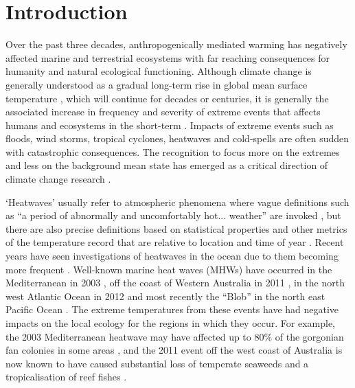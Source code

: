 \documentclass[a4paper,10pt,review]{elsarticle}
\begin{document}
\linenumbers

\section{Introduction}
Over the past three decades, anthropogenically mediated warming has negatively affected marine and terrestrial ecosystems with far reaching consequences for humanity and natural ecological functioning. Although climate change is generally understood as a gradual long-term rise in global mean surface temperature \citep{IPCC2014}, which will continue for decades or centuries, it is generally the associated increase in frequency and severity of extreme events that affects humans and ecosystems in the short-term \citep{Easterling2000}. Impacts of extreme events such as floods, wind storms, tropical cyclones, heatwaves and cold-spells are often sudden with catastrophic consequences. The recognition to focus more on the extremes and less on the background mean state has emerged as a critical direction of climate change research \citep{Jentsch2007}.

`Heatwaves' usually refer to atmospheric phenomena where vague definitions such as ``a period of abnormally and uncomfortably hot... weather'' are invoked \citep{Glickman2000}, but there are also precise definitions based on statistical properties and other metrics of the temperature record that are relative to location and time of year \citep[e.g.][]{Meehl2004, Alexander2006, Fischer2010, Fischer2011, Perkins2013}. Recent years have seen investigations of heatwaves in the ocean due to them becoming more frequent \citep[e.g.][]{Mackenzie2007, Selig2010, Sura2011, Lima2012, DeCastro2014}. Well-known marine heat waves (MHWs) have occurred in the Mediterranean in 2003 \citep{Black2004, Olita2007, Garrabou2009}, off the coast of Western Australia in 2011 \citep{Feng2013, Pearce2013, Wernberg2013}, in the north west Atlantic Ocean in 2012 \citep{Mills2012, Chen2014, Chen2015} and most recently the ``Blob'' in the north east Pacific Ocean \citep{Bond2015}. The extreme temperatures from these events have had negative impacts on the local ecology for the regions in which they occur. For example, the 2003 Mediterranean heatwave may have affected up to 80\% of the gorgonian fan colonies in some areas \citep{Garrabou2009}, and the 2011 event off the west coast of Australia is now known to have caused substantial loss of temperate seaweeds and a tropicalisation of reef fishes \citep{Wernberg2013}. %
\end{document}
